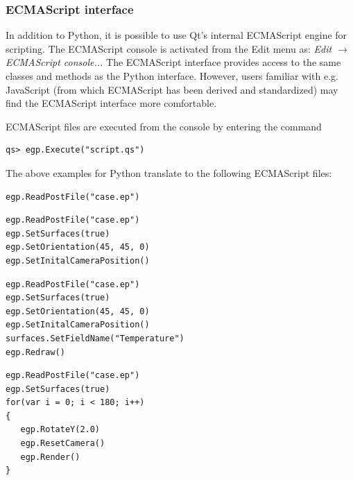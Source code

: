 \documentclass[a4paper,12pt]{article}
\newcommand{\menu}[2]{{\it \vskip2mm #1 $\rightarrow$ #2 \vskip2mm}}
\begin{document}
\subsubsection{ECMAScript interface}

In addition to Python, it is possible to use Qt's internal ECMAScript engine for scripting. The ECMAScript console is activated from
the Edit menu as:
\menu{Edit}{ECMAScript console...}
The ECMAScript interface provides access to the same classes and methods
as the Python interface. However, users familiar with e.g. JavaScript (from
which ECMAScript has been derived and standardized) may find the ECMAScript interface more comfortable.

ECMAScript files are executed from the console by entering the command
\begin{footnotesize}
\begin{verbatim}
qs> egp.Execute("script.qs")
\end{verbatim}
\end{footnotesize}

The above examples for Python translate to the following ECMAScript files:

\vskip5mm
\begin{footnotesize}
\begin{verbatim}
egp.ReadPostFile("case.ep")
\end{verbatim}
\end{footnotesize}

\vskip5mm
\begin{footnotesize}
\begin{verbatim}
egp.ReadPostFile("case.ep")
egp.SetSurfaces(true)
egp.SetOrientation(45, 45, 0)
egp.SetInitalCameraPosition()
\end{verbatim}
\end{footnotesize}

\vskip5mm
\begin{footnotesize}
\begin{verbatim}
egp.ReadPostFile("case.ep")
egp.SetSurfaces(true)
egp.SetOrientation(45, 45, 0)
egp.SetInitalCameraPosition()
surfaces.SetFieldName("Temperature")
egp.Redraw()
\end{verbatim}
\end{footnotesize}

\vskip5mm
\begin{footnotesize}
\begin{verbatim}
egp.ReadPostFile("case.ep")
egp.SetSurfaces(true)
for(var i = 0; i < 180; i++)
{
   egp.RotateY(2.0)
   egp.ResetCamera()
   egp.Render()
}
\end{verbatim}
\end{footnotesize}
\end{document}
